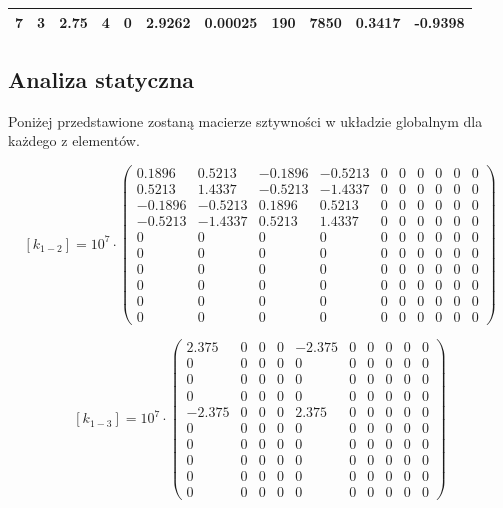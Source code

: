 \documentclass[12pt, a4papper, twoside]{article}
\begin{document}
\begin{table}[H]
\begin{tabular}{|c|c|c|c|c|c|c|c|c|c|c|}
7                                                                       & 3                                   & 2.75                                   & 4                                   & 0                                      & 2.9262                                                               & 0.00025                                                                & 190                                                                    & 7850                                                                                   & 0.3417        & -0.9398      \\ \hline
\end{tabular}
\end{table}

\newpage

\subsection{Analiza statyczna}
\label{sec:stat:matlab}

Poniżej przedstawione zostaną macierze sztywności w układzie globalnym dla każdego z elementów.

$$ [k_{1-2}]= 10^7 \cdot \left(\begin{matrix}0.1896&0.5213&-0.1896&-0.5213&0&0&0&0&0&0\\0.5213&1.4337&-0.5213&-1.4337&0&0&0&0&0&0\\-0.1896&-0.5213&0.1896&0.5213&0&0&0&0&0&0\\-0.5213&-1.4337&0.5213&1.4337&0&0&0&0&0&0\\0&0&0&0&0&0&0&0&0&0\\0&0&0&0&0&0&0&0&0&0\\0&0&0&0&0&0&0&0&0&0\\0&0&0&0&0&0&0&0&0&0\\0&0&0&0&0&0&0&0&0&0\\0&0&0&0&0&0&0&0&0&0\end{matrix}\right) $$


$$ [k_{1-3}]= 10^7 \cdot \left(\begin{matrix}2.375&0&0&0&-2.375&0&0&0&0&0\\0&0&0&0&0&0&0&0&0&0\\0&0&0&0&0&0&0&0&0&0\\0&0&0&0&0&0&0&0&0&0\\-2.375&0&0&0&2.375&0&0&0&0&0\\0&0&0&0&0&0&0&0&0&0\\0&0&0&0&0&0&0&0&0&0\\0&0&0&0&0&0&0&0&0&0\\0&0&0&0&0&0&0&0&0&0\\0&0&0&0&0&0&0&0&0&0\end{matrix}\right) $$
\end{document}

